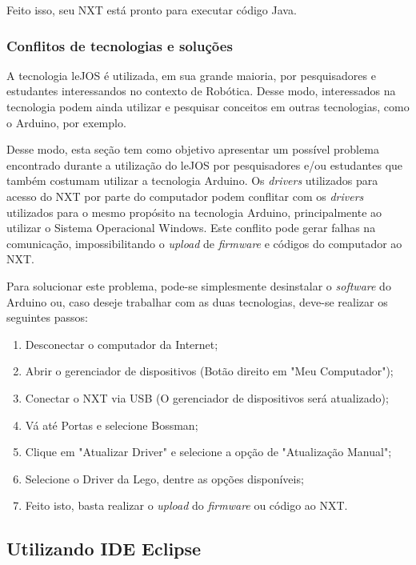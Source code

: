 	Feito isso, seu NXT está pronto para executar código Java.

\subsubsection{Conflitos de tecnologias e soluções}

A tecnologia leJOS é utilizada, em sua grande maioria, por pesquisadores e estudantes interessandos no contexto de Robótica. Desse modo, interessados na tecnologia
podem ainda utilizar e pesquisar conceitos em outras tecnologias, como o Arduino, por exemplo.

Desse modo, esta seção tem como objetivo apresentar um possível problema encontrado durante a utilização do leJOS por pesquisadores e/ou estudantes que também
costumam utilizar a tecnologia Arduino. Os \textit{drivers} utilizados para acesso do NXT por parte do computador podem conflitar com os \textit{drivers} utilizados
para o mesmo propósito na tecnologia Arduino, principalmente ao utilizar o Sistema Operacional Windows. Este conflito pode gerar falhas na comunicação, impossibilitando
o \textit{upload} de \textit{firmware} e códigos do computador ao NXT.

Para solucionar este problema, pode-se simplesmente desinstalar o \textit{software} do Arduino ou, caso deseje trabalhar com as duas tecnologias, deve-se realizar os seguintes passos:

\begin{enumerate}
	\item Desconectar o computador da Internet;
	\item Abrir o gerenciador de dispositivos (Botão direito em "Meu Computador");
	\item Conectar o NXT via USB (O gerenciador de dispositivos será atualizado);
	\item Vá até Portas e selecione Bossman;
	\item Clique em "Atualizar Driver" e selecione a opção de "Atualização Manual";
	\item Selecione o Driver da Lego, dentre as opções disponíveis;
	\item Feito isto, basta realizar o \textit{upload} do \textit{firmware} ou código ao NXT.
\end{enumerate}


\subsection{Utilizando IDE Eclipse} %
\label{sub:utilizando_ide_eclipse}

